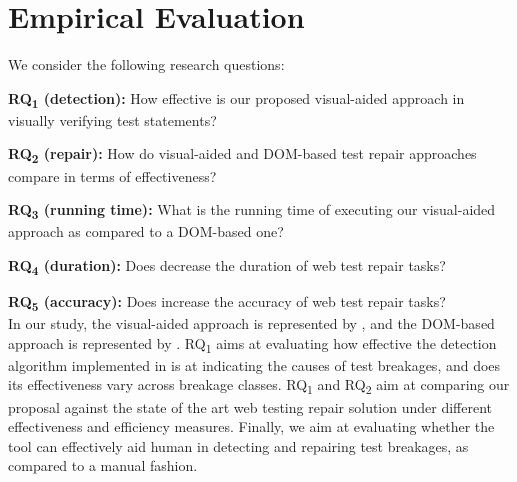 
\section{Empirical Evaluation}\label{sec:evaluation}

We consider the following research questions:

\noindent
\textbf{RQ\textsubscript{1} (detection):} How effective is our proposed visual-aided approach in visually verifying test statements?

\noindent
\textbf{RQ\textsubscript{2} (repair):} How do visual-aided and DOM-based test repair approaches compare in terms of effectiveness?

\noindent
\textbf{RQ\textsubscript{3} (running time):} What is the running time of executing our visual-aided approach as compared to a DOM-based one?

\noindent
\textbf{RQ\textsubscript{4} (duration):} Does \tool decrease the duration of web test repair tasks?

\noindent
\textbf{RQ\textsubscript{5} (accuracy):} Does \tool increase the accuracy of web test repair tasks? \\

\noindent
In our study, the visual-aided approach is represented by \tool, and the DOM-based approach is represented by \water. RQ\textsubscript{1} aims at evaluating how effective the detection algorithm implemented in \tool is at indicating the causes of test breakages, and does its effectiveness vary across breakage
classes. RQ\textsubscript{1} and RQ\textsubscript{2} aim at comparing our proposal against the state of the art web testing repair solution under different effectiveness and efficiency measures. Finally, we aim at evaluating whether the tool can effectively aid human in detecting and repairing test breakages, as compared to a manual fashion.

